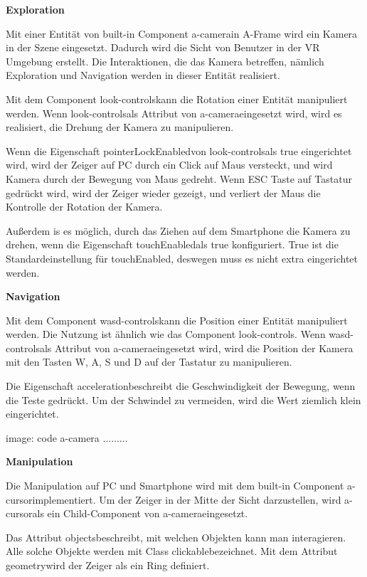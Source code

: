   \textbf{Exploration}
  
  Mit einer Entität von built-in Component \glqq a-camera\grqq in A-Frame wird ein Kamera in der Szene eingesetzt. Dadurch wird die Sicht von Benutzer in der VR Umgebung erstellt. Die Interaktionen, die das Kamera betreffen, nämlich Exploration und Navigation werden in dieser Entität realisiert.
  
  Mit dem Component \glqq look-controls\grqq kann die Rotation einer Entität manipuliert werden. Wenn \grqq look-controls\grqq als Attribut von \glqq a-camera\grqq eingesetzt wird, wird es realisiert, die Drehung der Kamera zu manipulieren.
  
  Wenn die Eigenschaft \glqq pointerLockEnabled\grqq von \glqq look-controls\grqq  als true eingerichtet wird, wird der Zeiger auf PC durch ein Click auf Maus versteckt, und wird Kamera durch der Bewegung von Maus gedreht. Wenn ESC Taste auf Tastatur gedrückt wird, wird der Zeiger wieder gezeigt, und verliert der Maus die Kontrolle der Rotation der Kamera.
  
  Außerdem is es möglich, durch das Ziehen auf dem Smartphone die Kamera zu drehen, wenn die Eigenschaft \glqq touchEnabled\grqq als true konfiguriert. True ist die Standardeinstellung für \glqq touchEnabled\grqq, deswegen muss es nicht extra eingerichtet werden.
  
  \textbf{Navigation}
  
  Mit dem Component \glqq wasd-controls\grqq kann die Position einer Entität manipuliert werden. Die Nutzung ist ähnlich wie das Component \glqq look-controls\grqq. Wenn \grqq wasd-controls\grqq als Attribut von \glqq a-camera\grqq eingesetzt wird, wird die Position der Kamera mit den Tasten W, A, S und D auf der Tastatur zu manipulieren.
  
  Die Eigenschaft \glqq acceleration\grqq beschreibt die Geschwindigkeit der Bewegung, wenn die Teste gedrückt. Um der Schwindel zu vermeiden, wird die Wert ziemlich klein eingerichtet.
  
  image: code a-camera .........
  
  \textbf{Manipulation}
  
  Die Manipulation auf PC und Smartphone wird mit dem built-in Component \glqq a-cursor\grqq implementiert. Um der Zeiger in der Mitte der Sicht darzustellen, wird \glqq a-cursor\grqq als ein Child-Component von \glqq a-camera\grqq eingesetzt.
  
  Das Attribut \glqq objects\grqq beschreibt, mit welchen Objekten kann man interagieren. Alle solche Objekte werden mit Class \glqq clickable\grqq bezeichnet. Mit dem Attribut \glqq geometry\grqq wird der Zeiger als ein Ring definiert.
  
